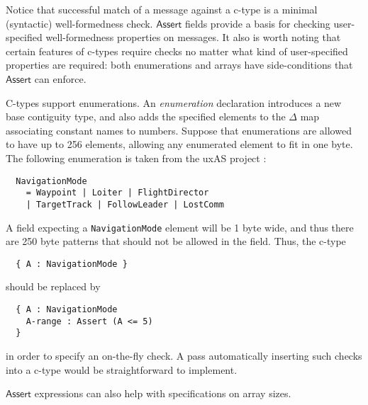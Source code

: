 \documentclass[svgnames]{llncs}
\newcommand{\konst}[1]{\ensuremath{\mathsf{#1}}}
\begin{document}
Notice that successful match of a message against a c-type is a
minimal (syntactic) well-formedness check. \konst{Assert} fields
provide a basis for checking user-specified well-formedness properties
on messages. It also is worth noting that certain features of c-types
require checks no matter what kind of user-specified properties are
required: both enumerations and arrays have side-conditions that
\konst{Assert} can enforce.

\begin{example}
C-types support enumerations. An \emph{enumeration} declaration
introduces a new base contiguity type, and also adds the specified
elements to the $\Delta$ map associating constant names to numbers.
Suppose that enumerations are allowed to have up to 256 elements,
allowing any enumerated element to fit in one byte. The following
enumeration is taken from the uxAS project \cite{}:
\begin{verbatim}
  NavigationMode
    = Waypoint | Loiter | FlightDirector
    | TargetTrack | FollowLeader | LostComm
\end{verbatim}

A field expecting a \verb+NavigationMode+ element will be 1 byte wide,
and thus there are 250 byte patterns that should not be allowed in the
field. Thus, the c-type

\begin{verbatim}
  { A : NavigationMode }
\end{verbatim}

should be replaced by

\begin{verbatim}
  { A : NavigationMode
    A-range : Assert (A <= 5)
  }
\end{verbatim}

\noindent in order to specify an on-the-fly check. A pass automatically
inserting such checks into a c-type would be straightforward to
implement.

\end{example}

\noindent \konst{Assert} expressions can also help with specifications
on array sizes.
\end{document}
